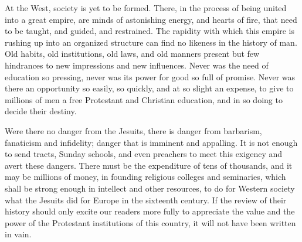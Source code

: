\documentclass[]{book}
\begin{document}
At the West, society is yet to be formed. There, in the process of being united into a great empire, are minds of astonishing energy, and hearts of fire, that need to be taught, and guided, and restrained. The rapidity with which this empire is rushing up into an organized structure can find no likeness in the history of man. Old habits, old institutions, old laws, and old manners present but few hindrances to new impressions and new influences. Never was the need of education so pressing, never was its power for good so full of promise. Never was there an opportunity so easily, so quickly, and at so slight an expense, to give to millions of men a free Protestant and Christian education, and in so doing to decide their destiny.

Were there no danger from the Jesuits, there is danger from barbarism, fanaticism and infidelity; danger that is imminent and appalling. It is not enough to send tracts, Sunday schools, and even preachers to meet this exigency and avert these dangers. There must be the expenditure of tens of thousands, and it may be millions of money, in founding religious colleges and seminaries, which shall be strong enough in intellect and other resources, to do for Western society what the Jesuits did for Europe in the sixteenth century. If the review of their history should only excite our readers more fully to appreciate the value and the power of the Protestant institutions of this country, it will not have been written in vain.


\end{document}
